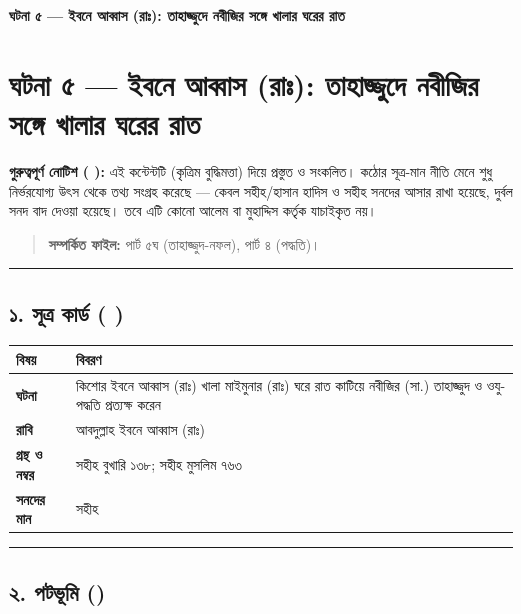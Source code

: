 

\begin{center}{\Large\bfseries\color{emerald} ঘটনা ৫ — ইবনে আব্বাস (রাঃ): তাহাজ্জুদে নবীজির সঙ্গে খালার ঘরের রাত}\end{center}
\vspace{1em}
\section*{ঘটনা ৫ — ইবনে আব্বাস (রাঃ): তাহাজ্জুদে নবীজির সঙ্গে খালার ঘরের রাত}

\begin{warnbox}
 \textbf{গুরুত্বপূর্ণ নোটিশ ( ):} এই কন্টেন্টটি  (কৃত্রিম বুদ্ধিমত্তা) দিয়ে প্রস্তুত ও সংকলিত।  কঠোর সূত্র-মান নীতি মেনে শুধু নির্ভরযোগ্য উৎস থেকে তথ্য সংগ্রহ করেছে — কেবল সহীহ/হাসান হাদিস ও সহীহ সনদের আসার রাখা হয়েছে, দুর্বল সনদ বাদ দেওয়া হয়েছে। তবে এটি কোনো আলেম বা মুহাদ্দিস কর্তৃক যাচাইকৃত নয়।
\end{warnbox}

\begin{quote}
\textbf{সম্পর্কিত ফাইল:} পার্ট ৫ঘ (তাহাজ্জুদ-নফল), পার্ট ৪ (পদ্ধতি)।
\end{quote}

\medskip\hrule\medskip

\subsection*{১. সূত্র কার্ড ( )}

\begin{table}[h]\centering\small
\begin{tabular}{ll}
বিষয় & বিবরণ \\
\hline
\textbf{ঘটনা} & কিশোর ইবনে আব্বাস (রাঃ) খালা মাইমুনার (রাঃ) ঘরে রাত কাটিয়ে নবীজির (সা.) তাহাজ্জুদ ও ওযু-পদ্ধতি প্রত্যক্ষ করেন \\
\textbf{রাবি} & আবদুল্লাহ ইবনে আব্বাস (রাঃ) \\
\textbf{গ্রন্থ ও নম্বর} & সহীহ বুখারি ১৩৮; সহীহ মুসলিম ৭৬৩ \\
\textbf{সনদের মান} & সহীহ \\
\hline
\end{tabular}
\end{table}

\medskip\hrule\medskip

\subsection*{২. পটভূমি ()}

